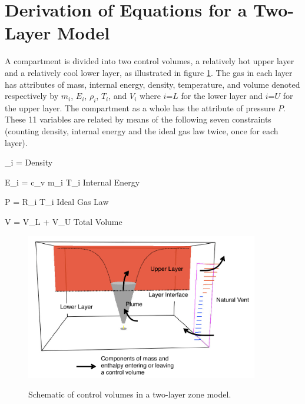 \section{Derivation of Equations for a Two-Layer Model}

A compartment is divided into two control volumes, a relatively hot upper layer and a relatively cool lower layer, as illustrated in figure \ref{fig:Control_Volumes}.  The gas in each layer has attributes of mass, internal energy, density, temperature, and volume denoted respectively by $m_i$, $E_i$, $\rho_i$, $T_i$, and $V_i$ where $i$=$L$ for the lower layer and $i$=$U$ for the upper layer.  The compartment as a whole has the attribute of pressure $P$.  These 11 variables are related by means of the following seven constraints (counting density, internal energy and the ideal gas law twice, once for each layer).

\be \rho _i  =  {\hspace{1.0in} \textnormal{Density}} \label{eq:density} \ee

\be  E_i = c_v m_i T_i {\hspace{1.0in} \textnormal{Internal Energy}} \label{eq:internal_energy} \ee

\be P = R\rho _i T_i {\hspace{1.0in} \textnormal{Ideal Gas Law}} \ee

\be V = V_L + V_U {\hspace{1.0in} \textnormal{Total Volume}} \label{eq:volume} \ee

\begin{figure}[h]
\begin{center}
\includegraphics[width=4.0in]{FIGURES/Theory/Control_Volumes}\\
\end{center}
\caption{Schematic of control volumes in a two-layer zone model.}
 \label{fig:Control_Volumes}
\end{figure}

